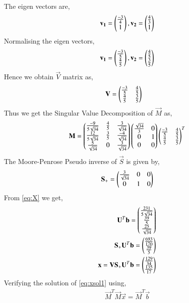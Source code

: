 \documentclass[journal,12pt,twocolumn]{IEEEtran}
\begin{document}
The eigen vectors are, 
\begin{align}
    \mathbf{v_1}= \begin{pmatrix}\frac{-3}{4}\\1\end{pmatrix},
    \mathbf{v_2}= \begin{pmatrix}\frac{4}{3}\\1\end{pmatrix}
\end{align}
Normalising the eigen vectors, 
\begin{align}
    \mathbf{v_1}=\begin{pmatrix}\frac{-3}{5}\\\frac{4}{5}\end{pmatrix},
    \mathbf{v_2}=\begin{pmatrix}\frac{4}{5}\\\frac{3}{5}\end{pmatrix}
\end{align}
Hence we obtain $\vec{V}$ matrix as, 
\begin{align}
    \mathbf{V}&= \begin{pmatrix}\frac{-3}{5}&\frac{4}{5}\\\frac{4}{5}&\frac{3}{5}\end{pmatrix}
\end{align}
Thus we get the Singular Value Decomposition of $\vec{M}$ as, 
\begin{align}
    \mathbf{M}= \begin{pmatrix}\frac{-9}{5\sqrt{34}} & \frac{4}{5} & \frac{3}{\sqrt{34}} \\ \frac{12}{5\sqrt{34}} & \frac{3}{5}& \frac{-4}{\sqrt{34}} \\ \frac{5}{\sqrt{34}} & 0 & \frac{3}{\sqrt{34}}\end{pmatrix}\begin{pmatrix}\frac{\sqrt{34}}{3} & 0 \\ 0 & 1 \\ 0 & 0\end{pmatrix}\begin{pmatrix}\frac{-3}{5}&\frac{4}{5} \\ \frac{4}{5} & \frac{3}{5}\end{pmatrix}^T
\end{align}
The Moore-Penrose Pseudo inverse of $\vec{S}$ is given by, 
\begin{align}
    \mathbf{S_+}= \begin{pmatrix}\frac{3}{\sqrt{34}} & 0 & 0 \\ 0 & 1 & 0\end{pmatrix}
\end{align}
From \eqref{eq:X} we get, 
\begin{align}
    \mathbf{U}^T\mathbf{b}= \begin{pmatrix}\frac{231}{5\sqrt{34}} \\ \frac{39}{5} \\ \frac{25}{\sqrt{34}}\end{pmatrix}\\
    \mathbf{S_+}\mathbf{U}^T\mathbf{b}= \begin{pmatrix}\frac{693}{170} \\ \frac{39}{5}\end{pmatrix}\\
    \mathbf{x}=\mathbf{V}\mathbf{S_+}\mathbf{U}^T\mathbf{b}= \begin{pmatrix}\frac{129}{34} \\ \frac{135}{17}\end{pmatrix} \label{eq:xsol1}
\end{align}
Verifying the solution of \eqref{eq:xsol1} using, 
\begin{align}
    \vec{M}^T\vec{M}\vec{x} = \vec{M}^T\vec{b}\label{eq:verify}
\end{align}
\end{document}
